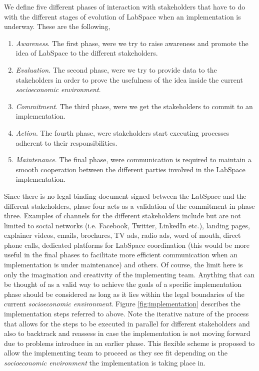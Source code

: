 \documentclass[a4paper, 11pt]{article}
\begin{document}
We define five different phases of interaction with stakeholders that have to do with the different stages of evolution of LabSpace when an implementation is underway. These are the following,

\begin{enumerate}[noitemsep]
    \item \textit{Awareness}. The first phase, were we try to raise awareness and promote the idea of LabSpace to the different stakeholders.
    \item \textit{Evaluation}. The second phase, were we try to provide data to the stakeholders in order to prove the usefulness of the idea inside the current \textit{socioeconomic environment}.
    \item \textit{Commitment}. The third phase, were we get the stakeholders to commit to an implementation.
    \item \textit{Action}. The fourth phase, were stakeholders start executing processes adherent to their responsibilities.
    \item \textit{Maintenance}. The final phase, were communication is required to maintain a smooth cooperation between the different parties involved in the LabSpace implementation.
\end{enumerate}

 Since there is no legal binding document signed between the LabSpace and the different stakeholders, phase four acts as a validation of the commitment in phase three. Examples of channels for the different stakeholders include but are not limited to social networks (i.e. Facebook, Twitter, LinkedIn etc.), landing pages, explainer videos, emails, brochures, TV ads, radio ads, word of mouth, direct phone calls, dedicated platforms for LabSpace coordination (this would be more useful in the final phases to facilitate more efficient communication when an implementation is under maintenance) and others. Of course, the limit here is only the imagination and creativity of the implementing team. Anything that can be thought of as a valid way to achieve the goals of a specific implementation phase should be considered as long as it lies within the legal boundaries of the current \textit{socioeconomic environment}. Figure \ref{fig:implementation} describes the implementation steps referred to above. Note the iterative nature of the process that allows for the steps to be executed in parallel for different stakeholders and also to backtrack and reassess in case the implementation is not moving forward due to problems introduce in an earlier phase. This flexible scheme is proposed to allow the implementing team to proceed as they see fit depending on the \textit{socioeconomic environment} the implementation is taking place in.
\end{document}
